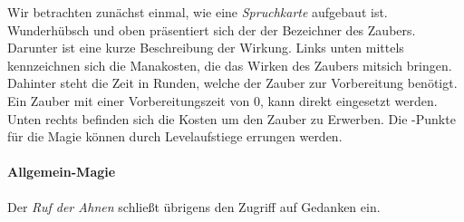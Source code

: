 Wir betrachten zunächst einmal, wie eine \emph{Spruchkarte} aufgebaut ist. Wunderhübsch und oben präsentiert sich der der Bezeichner des Zaubers. Darunter ist eine kurze Beschreibung der Wirkung. Links unten mittels \MP{} kennzeichnen sich die Manakosten, die das Wirken des Zaubers mitsich bringen. Dahinter steht die Zeit in Runden, welche der Zauber zur Vorbereitung benötigt. Ein Zauber mit einer Vorbereitungszeit von 0, kann direkt eingesetzt werden.
Unten rechts befinden sich die Kosten um den Zauber zu Erwerben. Die \SP{}-Punkte für die Magie können durch Levelaufstiege errungen werden.

\paragraph{Allgemein-Magie}

Der \emph{Ruf der Ahnen} schließt übrigens den Zugriff auf Gedanken ein.

\begin{center}
\end{center}